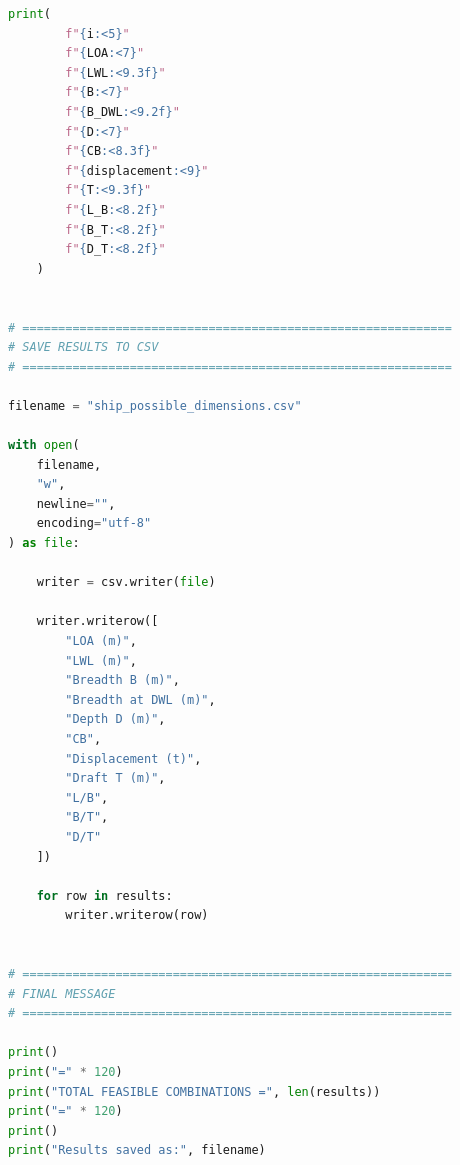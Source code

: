 \begin{lstlisting}[language=Python,
    caption={Python program for generating feasible ship main dimensions},
    label={lst:ship_dimension_generator}]
    print(
        f"{i:<5}"
        f"{LOA:<7}"
        f"{LWL:<9.3f}"
        f"{B:<7}"
        f"{B_DWL:<9.2f}"
        f"{D:<7}"
        f"{CB:<8.3f}"
        f"{displacement:<9}"
        f"{T:<9.3f}"
        f"{L_B:<8.2f}"
        f"{B_T:<8.2f}"
        f"{D_T:<8.2f}"
    )


# ============================================================
# SAVE RESULTS TO CSV
# ============================================================

filename = "ship_possible_dimensions.csv"

with open(
    filename,
    "w",
    newline="",
    encoding="utf-8"
) as file:

    writer = csv.writer(file)

    writer.writerow([
        "LOA (m)",
        "LWL (m)",
        "Breadth B (m)",
        "Breadth at DWL (m)",
        "Depth D (m)",
        "CB",
        "Displacement (t)",
        "Draft T (m)",
        "L/B",
        "B/T",
        "D/T"
    ])

    for row in results:
        writer.writerow(row)


# ============================================================
# FINAL MESSAGE
# ============================================================

print()
print("=" * 120)
print("TOTAL FEASIBLE COMBINATIONS =", len(results))
print("=" * 120)
print()
print("Results saved as:", filename)
\end{lstlisting}
